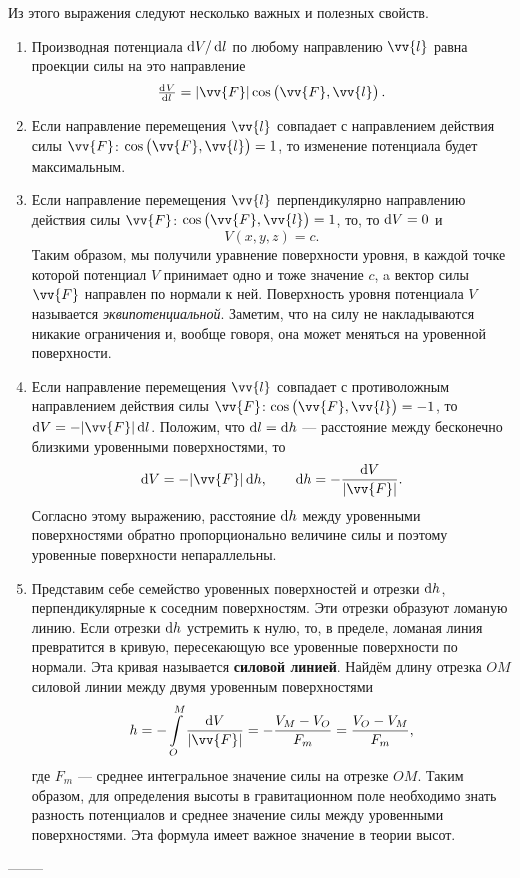 \documentclass[11pt, a4paper]{article}
\theoremstyle{plain}
\theoremstyle{definition}
\theoremstyle{remark}
\begin{document}
Из этого выражения следуют несколько важных и полезных свойств.
\begin{enumerate}
    \item Производная потенциала $\dif V/ \dif l$ по любому направлению $\vv{l}$ равна проекции силы на
        это направление
        \begin{equation*}
            \od{V}{l} =  |\vv{F}|\cos \left(\vv{F}, \vv{l}\right).
        \end{equation*}
    \item Если направление перемещения $\vv{l}$ совпадает с направлением действия силы $\vv{F}$: $\cos\left( \vv{F}, \vv{l} \right) = 1$, то изменение потенциала будет максимальным.
    \item Если направление перемещения $\vv{l}$ перпендикулярно направлению действия силы $\vv{F}$: $\cos\left( \vv{F}, \vv{l} \right) = 1$, то, то $\dif V = 0$ и 
        \begin{equation*}
            V\left( x, y, z \right) = c.
        \end{equation*}
        Таким образом, мы получили уравнение поверхности уровня, в каждой точке которой потенциал $V$ принимает одно и тоже значение $c$, a вектор силы $\vv{F}$ направлен по нормали к ней. Поверхность уровня потенциала $V$ называется \textit{эквипотенциальной}. Заметим, что на силу не накладываются никакие ограничения и, вообще говоря, она может меняться на уровенной поверхности.
    \item Если направление перемещения $\vv{l}$ совпадает с противоложным направлением действия силы $\vv{F}$: $\cos\left( \vv{F}, \vv{l} \right) = -1$, то $\dif V = - |\vv{F}| \dif l$. Положим, что $\dif l = \dif h$ --- расстояние между бесконечно близкими уровенными поверхностями, то
        \begin{equation*}
            \dif V = - |\vv{F}| \dif h, \qquad \dif h = -\dfrac{\dif V}{|\vv{F}|}.     
        \end{equation*}
        Согласно этому выражению, расстояние $\dif h$ между уровенными поверхностями обратно пропорционально величине силы и поэтому уровенные поверхности непараллельны.

	\item Представим себе семейство уровенных поверхностей и отрезки $\dif h$, перпендикулярные к соседним поверхностям. Эти отрезки образуют ломаную линию. Если отрезки $\dif h$ устремить к нулю, то, в пределе, ломаная линия превратится в кривую, пересекающую все уровенные поверхности по нормали. Эта кривая называется \textbf{силовой линией}. Найдём длину отрезка $OM$ силовой линии между двумя уровенным
        поверхностями
        \begin{equation*}
            h = -\int\limits_{O}^{M} \dfrac{\dif V}{|\vv{F}|} = - \dfrac{V_M - V_O}{F_m} =
            \dfrac{V_O - V_M}{F_m},
        \end{equation*}
        где $F_m$ --- среднее интегральное значение силы на отрезке $OM$. Таким образом, для
        определения высоты в гравитационном поле необходимо знать разность потенциалов и среднее
        значение силы между уровенными поверхностями. Эта формула имеет важное значение в теории
        высот.
\end{enumerate}
--------
\end{document}
